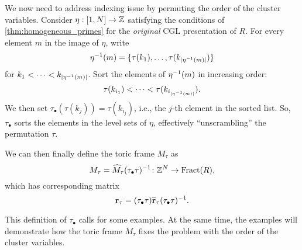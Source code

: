 We now need to address indexing issue by permuting the order of the cluster variables.
Consider $\eta : [1, N] \to \mathbb{Z}$ satisfying the conditions of
\cref{thm:homogeneous_primes} for the \emph{original} CGL presentation of $R$. For
every element $m$ in the image of $\eta$, write
\begin{equation*}
	\eta^{-1}(m) = \{\tau(k_1), \dots, \tau(k_{|\eta^{-1}(m)|})\}
\end{equation*}
for $k_1 < \cdots < k_{|\eta^{-1}(m)|}$. Sort the elements of $\eta^{-1}(m)$ in increasing order:
\begin{equation*}
	\tau(k_{i_1}) < \cdots < \tau(k_{i_{|\eta^{-1}(m)|}}).
\end{equation*}
We then set $\tau_\bullet(\tau(k_j)) = \tau(k_{i_j})$, i.e., the $j$-th element in the sorted list. So, $\tau_\bullet$ sorts the elements in the level sets of $\eta$, effectively ``unscrambling'' the permutation $\tau$.

We can then finally define the toric frame $M_\tau$ as
\begin{equation}\label{eq:M_tau}
	M_\tau = \widehat{M}_\tau (\tau_\bullet \tau)^{-1} \colon \mathbb{Z}^N \to \operatorname{Fract}(R),
\end{equation}
which has corresponding matrix
\begin{equation}\label{eq:r_tau}
	\mathbf{r}_\tau = (\tau_\bullet \tau)\widehat{\mathbf{r}}_\tau(\tau_\bullet \tau)^{-1}.
\end{equation}

This definition of $\tau_\bullet$ calls for some examples. At the same time, the
examples will demonstrate how the toric frame $M_\tau$ fixes the problem with the order
of the cluster variables.

